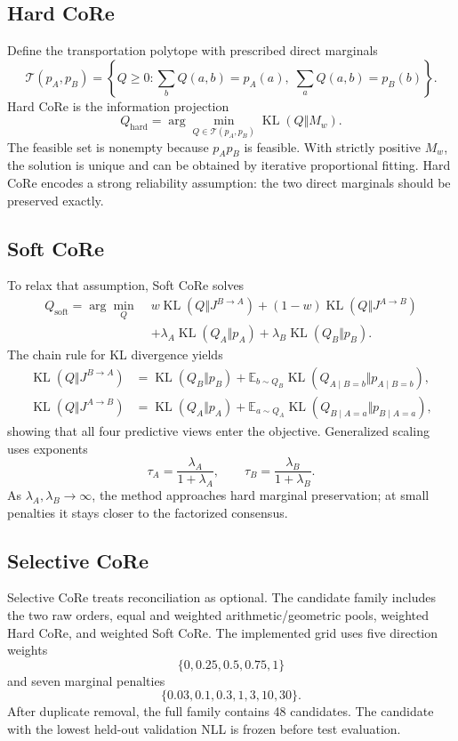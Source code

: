 \documentclass[a4paper,fleqn]{cas-sc}
\newcommand{\KL}{\operatorname{KL}}
\newcommand{\E}{\mathbb{E}}
\newcommand{\Jone}{J^{B\rightarrow A}}
\newcommand{\Jtwo}{J^{A\rightarrow B}}
\newcommand{\Qhard}{Q_{\mathrm{hard}}}
\newcommand{\Qsoft}{Q_{\mathrm{soft}}}
\begin{document}
\subsection{Hard CoRe}
Define the transportation polytope with prescribed direct marginals
\begin{equation}
\mathcal{T}(p_A,p_B)=\left\{Q\ge0:\sum_bQ(a,b)=p_A(a),\;\sum_aQ(a,b)=p_B(b)\right\}.
\end{equation}
Hard CoRe is the information projection
\begin{equation}
\Qhard=\arg\min_{Q\in\mathcal{T}(p_A,p_B)}\KL(Q\Vert M_w).
\end{equation}
The feasible set is nonempty because $p_Ap_B$ is feasible. With strictly positive $M_w$, the solution is unique and can be obtained by iterative proportional fitting. Hard CoRe encodes a strong reliability assumption: the two direct marginals should be preserved exactly.

\subsection{Soft CoRe}
To relax that assumption, Soft CoRe solves
\begin{align}
\Qsoft=\arg\min_Q\;&w\KL(Q\Vert\Jone)+(1-w)\KL(Q\Vert\Jtwo)\nonumber\\
&+\lambda_A\KL(Q_A\Vert p_A)+\lambda_B\KL(Q_B\Vert p_B).
\end{align}
The chain rule for KL divergence yields
\begin{align}
\KL(Q\Vert\Jone)&=\KL(Q_B\Vert p_B)+\E_{b\sim Q_B}\KL(Q_{A\mid B=b}\Vert p_{A\mid B=b}),\\
\KL(Q\Vert\Jtwo)&=\KL(Q_A\Vert p_A)+\E_{a\sim Q_A}\KL(Q_{B\mid A=a}\Vert p_{B\mid A=a}),
\end{align}
showing that all four predictive views enter the objective. Generalized scaling uses exponents
\begin{equation}
\tau_A=\frac{\lambda_A}{1+\lambda_A},\qquad
\tau_B=\frac{\lambda_B}{1+\lambda_B}.
\end{equation}
As $\lambda_A,\lambda_B\rightarrow\infty$, the method approaches hard marginal preservation; at small penalties it stays closer to the factorized consensus.

\subsection{Selective CoRe}
Selective CoRe treats reconciliation as optional. The candidate family includes the two raw orders, equal and weighted arithmetic/geometric pools, weighted Hard CoRe, and weighted Soft CoRe. The implemented grid uses five direction weights
\begin{equation}
\{0,0.25,0.5,0.75,1\}
\end{equation}
and seven marginal penalties
\begin{equation}
\{0.03,0.1,0.3,1,3,10,30\}.
\end{equation}
After duplicate removal, the full family contains 48 candidates. The candidate with the lowest held-out validation NLL is frozen before test evaluation.
\end{document}

